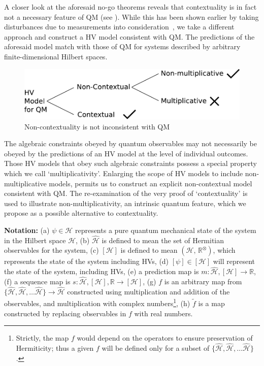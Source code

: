 \documentclass[british,aps,prl,superscriptaddress,nofootinbib,times,reprint]{revtex4-1}
\theoremstyle{plain}
\theoremstyle{definition}
\theoremstyle{remark}
\theoremstyle{remark}
\theoremstyle{remark}
\theoremstyle{plain}
\theoremstyle{plain}
\theoremstyle{plain}
\theoremstyle{definition}
\theoremstyle{definition}
\begin{document}
A closer look at the aforesaid no-go theorems
reveals that contextuality is in fact not a
necessary feature of QM (see ).
While this has been shown earlier by taking
disturbances due to measurements into
consideration~\cite{NoContextuality,LaCourNoCntx},
we take a different approach and construct a
HV model consistent with QM.  The predictions of
the aforesaid model match with those of QM for systems
described by arbitrary finite-dimensional Hilbert
spaces.  \begin{figure}[h]
\includegraphics[width=\columnwidth]{block1}
\caption{Non-contextuality is not inconsistent
with QM} \label{fig:block}\end{figure} The
algebraic constraints obeyed by quantum
observables may not necessarily be obeyed by the
predictions of an HV model at the level of
individual outcomes.  Those HV models that obey
such algebraic constraints possess a special
property which we call `multiplicativity'.  
Enlarging the scope of HV models to include
non-multiplicative models, permits us to construct an
explicit non-contextual model consistent with QM.
The re-examination of the very proof of
`contextuality'  is used to illustrate
non-multiplicativity, an intrinsic quantum feature, 
which we propose as a possible alternative to contextuality. 


{\noindent \bf Notation:} (a) $\psi\in\mathcal{H}$ 
represents a pure quantum mechanical
state of the system in the Hilbert space
$\mathcal{H}$, (b) $\hat{\mathcal{H}}$ is defined
to mean the set of Hermitian 
observables for the system, (c)
$[\mathcal{H}]$ is defined to mean
$(\mathcal{H},\,\mathbb{R}^{\otimes})$, which
represents the state of the system including HVs,
(d) $[\psi]\in[\mathcal{H}]$ will represent the
state of the system, including HVs, (e) a
prediction map is
$m:\hat{\mathcal{H}},[\mathcal{H}]\to\mathbb{R}$,
(f) a sequence map is
$s:\hat{\mathcal{H}},[\mathcal{H}],\mathbb{R}\to[\mathcal{H}]$,
(g) $f$ is an arbitrary map from $\{
\hat{\mathcal{H}},\hat{\mathcal{H}},\dots\hat{\mathcal{H}}
\} \to \hat{\mathcal{H}}$ constructed using
multiplication and addition of the observables,
and multiplication with complex
numbers\footnote{Strictly, the map $f$ would
depend on the operators to ensure preservation of
Hermiticity; thus a given $f$ will be defined only
for a subset of $\{
\hat{\mathcal{H}},\hat{\mathcal{H}},\dots\hat{\mathcal{H}}
\}$.}, (h) $\tilde{f}$ is a map constructed by
replacing observables in $f$ with real numbers.
\end{document}
